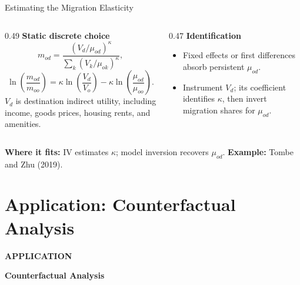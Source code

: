 \documentclass[aspectratio=169,11pt]{beamer}
\newcommand{\B}[1]{\textcolor{blue1}{\textbf{#1}}}
\begin{document}
\begin{frame}[t]{Estimating the Migration Elasticity}
  \footnotesize
  \begin{columns}[T,onlytextwidth]
    \begin{column}{0.49\textwidth}
      \B{Static discrete choice}
      \[
        m_{od}
          =\frac{(V_d/\mu_{od})^\kappa}
          {\displaystyle\sum_k(V_k/\mu_{ok})^\kappa},
      \]
      \[
        \ln\!\left(\frac{m_{od}}{m_{oo}}\right)
          =\kappa\ln\!\left(\frac{V_d}{V_o}\right)
           -\kappa\ln\!\left(\frac{\mu_{od}}{\mu_{oo}}\right).
      \]
      {\footnotesize \(V_d\) is destination indirect utility, including income,
      goods prices, housing rents, and amenities.}
    \end{column}
    \begin{column}{0.47\textwidth}
      \B{Identification}
      \begin{itemize}\setlength{\itemsep}{5pt}
        \item Fixed effects or first differences absorb persistent \(\mu_{od}\).
        \item Instrument \(V_d\); its coefficient identifies \(\kappa\), then invert
          migration shares for \(\mu_{od}\).
      \end{itemize}
    \end{column}
  \end{columns}

  \vfill
  {\scriptsize \B{Where it fits:} IV estimates \(\kappa\); model inversion recovers
  \(\mu_{od}\). \quad \B{Example:} Tombe and Zhu (2019).}
\end{frame}

\section{Application: Counterfactual Analysis}

\begin{frame}[plain]
  \vfill
  \begin{center}
    {\color{deepred}\Large\bfseries APPLICATION\par}
    \vspace{0.75em}
    {\color{oxfordblue}\LARGE\bfseries Counterfactual Analysis\par}
  \end{center}
  \vfill
\end{frame}

\setcounter{subsection}{0}
\end{document}

